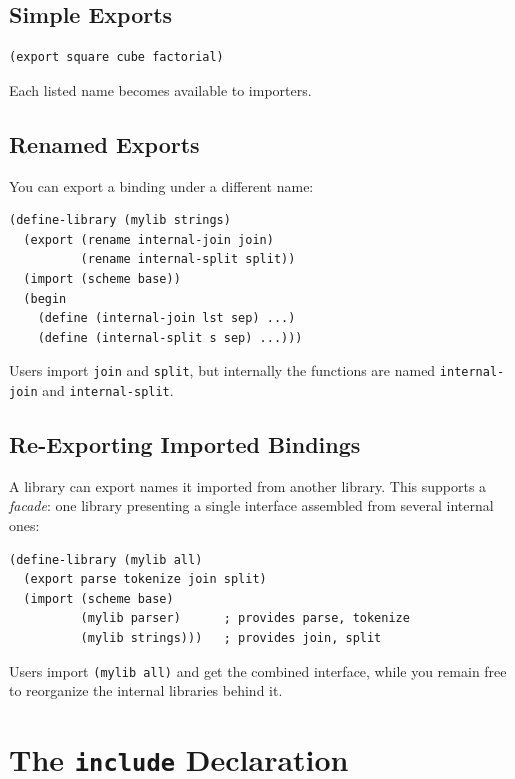 \subsection{Simple Exports}

\begin{lstlisting}
(export square cube factorial)
\end{lstlisting}

Each listed name becomes available to importers.

\subsection{Renamed Exports}

You can export a binding under a different name:

\begin{lstlisting}
(define-library (mylib strings)
  (export (rename internal-join join)
          (rename internal-split split))
  (import (scheme base))
  (begin
    (define (internal-join lst sep) ...)
    (define (internal-split s sep) ...)))
\end{lstlisting}

Users import \texttt{join} and \texttt{split}, but internally the functions are named \texttt{internal-join} and \texttt{internal-split}.

\subsection{Re-Exporting Imported Bindings}

A library can export names it imported from another library. This supports a \emph{facade}: one library presenting a single interface assembled from several internal ones:

\begin{lstlisting}
(define-library (mylib all)
  (export parse tokenize join split)
  (import (scheme base)
          (mylib parser)      ; provides parse, tokenize
          (mylib strings)))   ; provides join, split
\end{lstlisting}

Users import \texttt{(mylib all)} and get the combined interface, while you remain free to reorganize the internal libraries behind it.

\section{The \texttt{include} Declaration}

